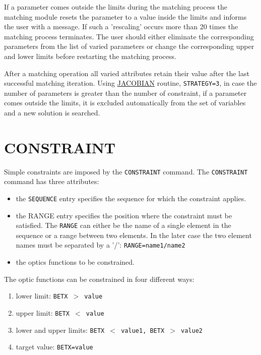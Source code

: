 If a parameter comes outside the
limits during the matching process the matching module resets the
parameter to a value inside the limits and informs the user with a
message. If such a 'rescaling' occurs more than 20 times the matching
process terminates. The user should either eliminate the corresponding
parameters from the list of varied parameters or change the
corresponding upper and lower limits before restarting the matching
process. 

After a matching operation all varied attributes retain their
value after the last successful matching iteration. Using
\hyperref[sec:jacobian]{JACOBIAN} routine, {\tt STRATEGY=3}, in case
the number of parameters is greater than the number of constraint, if a
parameter comes outside the limits, it is excluded automatically from
the set of variables and a new solution is searched.  




%

\section{CONSTRAINT}
\label{sec:constraint}

Simple constraints are imposed by the {\tt CONSTRAINT} command. 
The {\tt CONSTRAINT} command has three attributes:   
\begin{itemize}
 \item  the {\tt SEQUENCE} entry specifies the sequence for which the
   constraint applies.  
 \item  the RANGE entry specifies the position where the
   constraint must be satisfied. The {\tt RANGE} can either be the name
   of a single element in the sequence or a range between two
   elements. In the later case the two element names must be
   separated by a '/': {\tt RANGE=name1/name2}  
 \item the optics functions to be constrained. 
\end{itemize} 

The optic functions can be constrained in four different ways: 
\begin{enumerate}
 \item lower limit: {\tt BETX $>$ value}
 \item upper limit: {\tt BETX $<$ value}
 \item lower and upper limits: {\tt BETX $<$ value1, 
   BETX $>$ value2} 
 \item target value: {\tt BETX=value}
\end{enumerate} 

